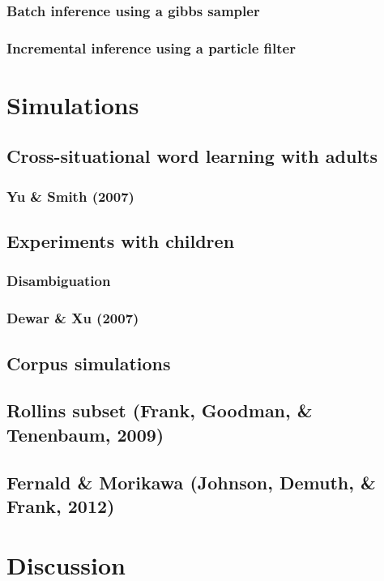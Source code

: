 \documentclass[man,noapacite]{apa2}
\begin{document}
\subsubsection{Batch inference using a gibbs sampler}

\subsubsection{Incremental inference using a particle filter}

\section{Simulations}

\subsection{Cross-situational word learning with adults}

\subsubsection{Yu \& Smith (2007)}

\subsection{Experiments with children}

\subsubsection{Disambiguation}

\subsubsection{Dewar \& Xu (2007)}


\subsection{Corpus simulations}

\subsection{Rollins subset (Frank, Goodman, \& Tenenbaum, 2009)}

\subsection{Fernald \& Morikawa (Johnson, Demuth, \& Frank, 2012)}

\section{Discussion}

\newpage



\end{document}

